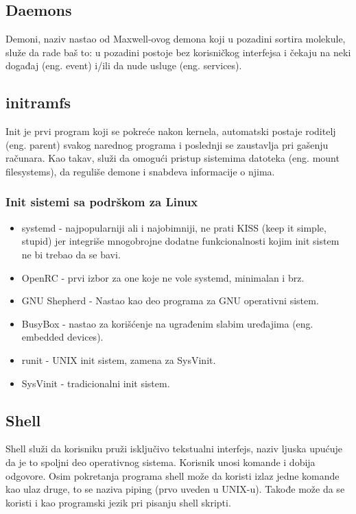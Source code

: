 \documentclass[a4paper,14pt]{article}
\begin{document}
\subsection{Daemons}
Demoni, naziv nastao od Maxwell-ovog demona koji u pozadini sortira molekule, služe da rade baš to: u pozadini postoje bez korisničkog interfejsa i čekaju na neki događaj (eng. event) i/ili da nude usluge (eng. services).

\subsection{initramfs}
Init je prvi program koji se pokreće nakon kernela, automatski postaje roditelj (eng. parent) svakog narednog programa i poslednji se zaustavlja pri gašenju računara. Kao takav, služi da omogući pristup sistemima datoteka (eng. mount filesystems), da reguliše demone i snabdeva informacije o njima.
\subsubsection{Init sistemi sa podrškom za Linux}
\begin{itemize}
\item systemd - najpopularniji ali i najobimniji, ne prati KISS (keep it simple, stupid) jer integriše mnogobrojne dodatne funkcionalnosti kojim init sistem ne bi trebao da se bavi.
\item OpenRC - prvi izbor za one koje ne vole systemd, minimalan i brz.
\item GNU Shepherd - Nastao kao deo programa za GNU operativni sistem.
\item BusyBox - nastao za korišćenje na ugrađenim slabim uređajima (eng. embedded devices).
\item runit - UNIX init sistem, zamena za SysVinit.
\item SysVinit - tradicionalni init sistem.
\end{itemize}
\newpage

\subsection{Shell}
Shell služi da korisniku pruži isključivo tekstualni interfejs, naziv ljuska upućuje da je to spoljni deo operativnog sistema. Korisnik unosi komande i dobija odgovore. Osim pokretanja programa shell može da koristi izlaz jedne komande kao ulaz druge, to se naziva piping (prvo uveden u UNIX-u). Takođe može da se koristi i kao programski jezik pri pisanju shell skripti.
\end{document}
